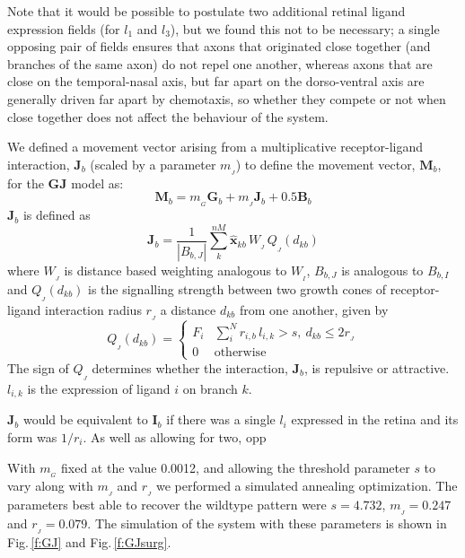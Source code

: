 \documentclass[11pt, a4paper]{article}
\begin{document}
Note that it would be possible to postulate two additional retinal ligand
expression fields (for $l_1$ and $l_3$), but we found this not to be
necessary; a single opposing pair of fields ensures that axons that originated
close together (and branches of the same axon) do not repel one another,
whereas axons that are close on the temporal-nasal axis, but far apart on the
dorso-ventral axis are generally driven far apart by chemotaxis, so whether
they compete or not when close together does not affect the behaviour of the
system.

We defined a movement vector arising from a multiplicative receptor-ligand
interaction, $\mathbf{J}_b$ (scaled by a parameter $m_{\!_J}$) to define the
movement vector, $\mathbf{M}_b$, for the $\mathbf{GJ}$ model as:
%
\begin{equation} \label{e:mv3}
 \mathbf{M}_{b} = m_{\!_G} \mathbf{G}_b + m_{\!_J} \mathbf{J}_b + 0.5 \mathbf{B}_b
\end{equation}
%
%
$\mathbf{J}_b$ is defined as
%
\begin{equation}
\mathbf{J}_b = \frac{1}{|B_{b,J}|} \sum_k^{nM} \hat{\mathbf{x}}_{kb}\,W_{\!_J}\,Q_{\!_J}(d_{kb})
\end{equation}
%
where $W_{\!_J}$ is distance based weighting analogous to $W_{\!_I}$,
$B_{b,J}$ is analogous to $B_{b,I}$ and $Q_{\!_J}(d_{kb})$ is the signalling
strength between two growth cones of receptor-ligand interaction radius
$r_{\!_J}$ a distance $d_{kb}$ from one another, given by
%
\begin{equation}
Q_{\!_J}(d_{kb}) = \begin{cases}
                 F_i & \sum_i^N r_{i,b}\,l_{i,k} > s,~d_{kb} \leq 2r_{\!_J} \\
                 0 & \mathrm{otherwise}
     \end{cases}
\end{equation}
%
The sign of $Q_{\!_J}$ determines whether the interaction, $\mathbf{J}_b$, is
repulsive or attractive. $l_{i,k}$ is the expression of ligand $i$ on branch
$k$.

$\mathbf{J}_b$ would be equivalent to $\mathbf{I}_b$ if there was a single
$l_i$ expressed in the retina and its form was $1/r_i$. As well as allowing
for two, opp

With $m_{\!_G}$ fixed at the value 0.0012, and allowing the threshold
parameter $s$ to vary along with $m_{\!_J}$ and $r_{\!_J}$ we performed a
simulated annealing optimization. The parameters best able to recover the
wildtype pattern were $s=4.732$, $m_{\!_J} = 0.247$ and $r_{\!_J} =
0.079$. The simulation of the system with these parameters is shown in
Fig.\,\ref{f:GJ} and Fig.\,\ref{f:GJsurg}.
\end{document}
